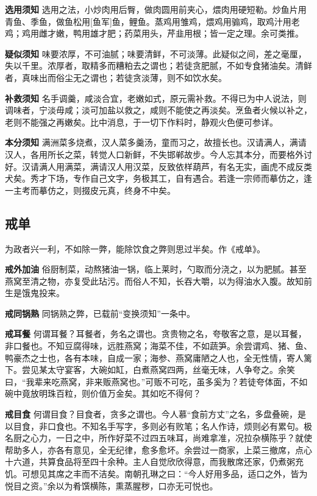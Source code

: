 \documentclass[]{article}
\begin{document}
\textbf{选用须知}
选用之法，小炒肉用后臀，做肉圆用前夹心，煨肉用硬短勒。炒鱼片用青鱼、季鱼，做鱼松用{[}鱼军{]}鱼，鲤鱼。蒸鸡用雏鸡，煨鸡用骟鸡，取鸡汁用老鸡；鸡用雌才嫩，鸭用雄才肥；药菜用头，芹韭用根；皆一定之理。余可类推。

\textbf{疑似须知}
味要浓厚，不可油腻；味要清鲜，不可淡薄。此疑似之间，差之毫厘，失以千里。浓厚者，取精多而糟粕去之谓也；若徒贪肥腻，不如专食猪油矣。清鲜者，真味出而俗尘无之谓也；若徒贪淡薄，则不如饮水矣。

\textbf{补救须知}
名手调羹，咸淡合宜，老嫩如式，原元需补救。不得已为中人说法，则调味者，宁淡毋咸；淡可加盐以救之，咸则不能使之再淡矣。烹鱼者火候以补之，老则不能强之再嫩矣。比中消息，于一切下作料时，静观火色便可参详。

\textbf{本分须知}
满洲菜多烧煮，汉人菜多羹汤，童而习之，故擅长也。汉请满人，满请汉人，各用所长之菜，转觉人口新鲜，不失邯郸故步。今人忘其本分，而要格外讨好。汉请满人用满菜，满请汉人用汉菜，反致依样葫芦，有名无实，画虎不成反类犬矣。秀才下场，专作自己文字，务极其工，自有遇合。若逢一宗师而摹仿之，逢一主考而摹仿之，则掇皮元真，终身不中矣。

\hypertarget{header-n11}{%
\subsection{戒单}\label{header-n11}}

为政者兴一利，不如除一弊，能除饮食之弊则思过半矣。作《戒单》。

\textbf{戒外加油}
俗厨制菜，动熬猪油一锅，临上莱时，勺取而分浇之，以为肥腻。甚至燕窝至清之物，亦复受此玷污。而俗人不知，长吞大嚼，以为得油水入腹。故知前生是饿鬼投来。

\textbf{戒同锅熟} 同锅熟之弊，已载前``变换须知''一条中。

\textbf{戒耳餐}
何谓耳餐？耳餐者，务名之谓也。贪贵物之名，夸敬客之意，是以耳餐，非口餐也。不知豆腐得味，远胜燕窝；海菜不佳，不如蔬笋。余尝谓鸡、猪、鱼、鸭豪杰之士也，各有本味，自成一家；海参、燕窝庸陋之人也，全无性情，寄人篱下。尝见某太守宴客，大碗如缸，白煮燕窝四两，丝毫无味，人争夸之。余笑曰，``我辈来吃燕窝，非来贩燕窝也。''可贩不可吃，虽多奚为？若徒夸体面，不如碗中竟放明珠百粒，则价值万金矣。其如吃不得何？

\textbf{戒目食}
何谓目食？目食者，贪多之谓也。今人慕``食前方丈''之名，多盘叠碗，是以目食，非口食也。不知名手写字，多则必有败笔；名人作诗，烦则必有累句。极名厨之心力，一日之中，所作好菜不过四五味耳，尚难拿准，况拉杂横陈乎？就使帮助多人，亦各有意见，全无纪律，愈多愈坏。余尝过一商家，上菜三撤席，点心十六道，共算食品将至四十余种。主人自觉欣欣得意，而我散席还家，仍煮粥充饥。可想见其席之丰而不洁矣。南朝孔琳之曰：``今人好用多品，适口之外，皆为悦目之资。''余以为肴馔横陈，熏蒸腥秽，口亦无可悦也。
\end{document}
